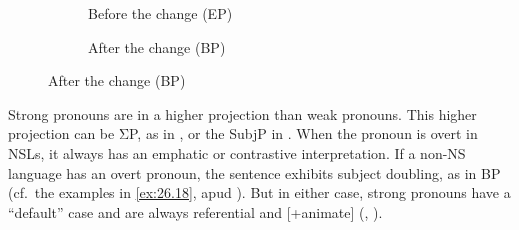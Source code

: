 \documentclass[output=paper]{langsci/langscibook}
\begin{document}
\begin{figure}
\caption{Pronominal Agr and weak pronouns\label{fig:ex:26.fig3}}
\begin{subfigure}[b]{.5\linewidth}\centering%
\caption{Before the change (\gls{EP})}
\end{subfigure}\begin{subfigure}[b]{.5\linewidth}\centering%
\caption{After the change (\gls{BP})}
    \end{subfigure}
\end{figure}

Strong pronouns are in a higher projection than weak pronouns. This higher
projection can be ΣP, as in \citet{Martins1994}, or the SubjP in
\citet{Cardinaletti:2004a}. When the pronoun is overt in \gls{NSL}s, it always
has an emphatic or contrastive interpretation. If a non-NS language has an
overt pronoun, the sentence exhibits subject doubling, as in
\gls{BP} (cf.\ the examples in \eqref{ex:26.18},
apud \citealt{Kato2012}). But in either case, strong pronouns have a “default”
case and are always referential and  [+animate] (\citealt{Kato1999},
\citealt{Schutze2001}).
\end{document}
